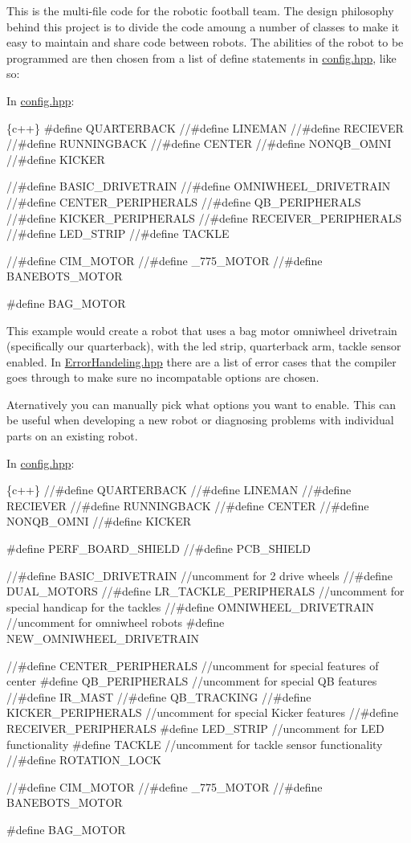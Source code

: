 This is the multi-\/file code for the robotic football team. The design philosophy behind this project is to divide the code amoung a number of classes to make it easy to maintain and share code between robots. The abilities of the robot to be programmed are then chosen from a list of define statements in \mbox{\hyperlink{_config_8hpp_source}{config.\+hpp}}, like so\+:

In \mbox{\hyperlink{_config_8hpp_source}{config.\+hpp}}\+: 
\begin{DoxyCode}
\{c++\}
#define QUARTERBACK
//#define LINEMAN
//#define RECIEVER
//#define RUNNINGBACK
//#define CENTER
//#define NONQB\_OMNI
//#define KICKER

//#define BASIC\_DRIVETRAIN
//#define OMNIWHEEL\_DRIVETRAIN
//#define CENTER\_PERIPHERALS
//#define QB\_PERIPHERALS
//#define KICKER\_PERIPHERALS
//#define RECEIVER\_PERIPHERALS
//#define LED\_STRIP
//#define TACKLE

//#define CIM\_MOTOR
//#define \_775\_MOTOR
//#define BANEBOTS\_MOTOR

#define BAG\_MOTOR
\end{DoxyCode}
 This example would create a robot that uses a bag motor omniwheel drivetrain (specifically our quarterback), with the led strip, quarterback arm, tackle sensor enabled. In \mbox{\hyperlink{_error_handeling_8hpp_source}{Error\+Handeling.\+hpp}} there are a list of error cases that the compiler goes through to make sure no incompatable options are chosen.

Aternatively you can manually pick what options you want to enable. This can be useful when developing a new robot or diagnosing problems with individual parts on an existing robot.

In \mbox{\hyperlink{_config_8hpp_source}{config.\+hpp}}\+: 
\begin{DoxyCode}
\{c++\}
//#define QUARTERBACK
//#define LINEMAN
//#define RECIEVER
//#define RUNNINGBACK
//#define CENTER
//#define NONQB\_OMNI
//#define KICKER

#define PERF\_BOARD\_SHIELD
//#define PCB\_SHIELD

//#define BASIC\_DRIVETRAIN    //uncomment for 2 drive wheels
//#define DUAL\_MOTORS
//#define LR\_TACKLE\_PERIPHERALS         //uncomment for special handicap for the tackles
//#define OMNIWHEEL\_DRIVETRAIN  //uncomment for omniwheel robots
#define NEW\_OMNIWHEEL\_DRIVETRAIN

//#define CENTER\_PERIPHERALS  //uncomment for special features of center 
#define QB\_PERIPHERALS      //uncomment for special QB features
//#define IR\_MAST
//#define QB\_TRACKING
//#define KICKER\_PERIPHERALS  //uncomment for special Kicker features
//#define RECEIVER\_PERIPHERALS  
#define LED\_STRIP       //uncomment for LED functionality
#define TACKLE          //uncomment for tackle sensor functionality
//#define ROTATION\_LOCK

//#define CIM\_MOTOR
//#define \_775\_MOTOR
//#define BANEBOTS\_MOTOR

#define BAG\_MOTOR
\end{DoxyCode}


